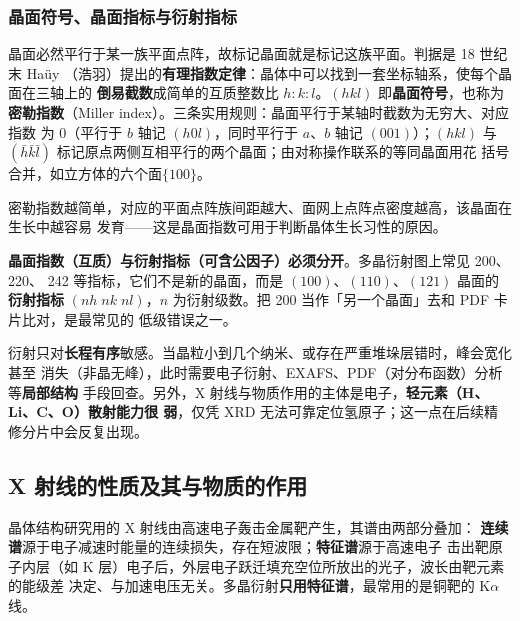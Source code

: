 \subsubsection{晶面符号、晶面指标与衍射指标}

晶面必然平行于某一族平面点阵，故标记晶面就是标记这族平面。判据是 18 世纪末 Haüy
（浩羽）提出的\textbf{有理指数定律}：晶体中可以找到一套坐标轴系，使每个晶面在三轴上的
\textbf{倒易截数}成简单的互质整数比 $h:k:l$。$(hkl)$ 即\textbf{晶面符号}，也称为
\textbf{密勒指数}（Miller index）。三条实用规则：晶面平行于某轴时截数为无穷大、对应指数
为 0（平行于 $b$ 轴记 $(h0l)$，同时平行于 $a$、$b$ 轴记 $(001)$）；$(hkl)$ 与
$(\bar{h}\bar{k}\bar{l})$ 标记原点两侧互相平行的两个晶面；由对称操作联系的等同晶面用花
括号合并，如立方体的六个面$\{100\}$。

密勒指数越简单，对应的平面点阵族间距越大、面网上点阵点密度越高，该晶面在生长中越容易
发育——这是晶面指数可用于判断晶体生长习性的原因。

\begin{keycond}
\textbf{晶面指数（互质）与衍射指标（可含公因子）必须分开}。多晶衍射图上常见 200、220、
242 等指标，它们不是新的晶面，而是 $(100)$、$(110)$、$(121)$ 晶面的\textbf{衍射指标}
$(nh\;nk\;nl)$，$n$ 为衍射级数。把 200 当作「另一个晶面」去和 PDF 卡片比对，是最常见的
低级错误之一。
\end{keycond}

\begin{crosscheck}
衍射只对\textbf{长程有序}敏感。当晶粒小到几个纳米、或存在严重堆垛层错时，峰会宽化甚至
消失（非晶无峰），此时需要电子衍射、EXAFS、PDF（对分布函数）分析等\textbf{局部结构}
手段回查。另外，X 射线与物质作用的主体是电子，\textbf{轻元素（H、Li、C、O）散射能力很
弱}，仅凭 XRD 无法可靠定位氢原子；这一点在后续精修分片中会反复出现。
\end{crosscheck}

\subsection{X 射线的性质及其与物质的作用}

\begin{principle}
晶体结构研究用的 X 射线由高速电子轰击金属靶产生，其谱由两部分叠加：
\textbf{连续谱}源于电子减速时能量的连续损失，存在短波限；\textbf{特征谱}源于高速电子
击出靶原子内层（如 K 层）电子后，外层电子跃迁填充空位所放出的光子，波长由靶元素的能级差
决定、与加速电压无关。多晶衍射\textbf{只用特征谱}，最常用的是铜靶的 K$\alpha$ 线。
\end{principle}

